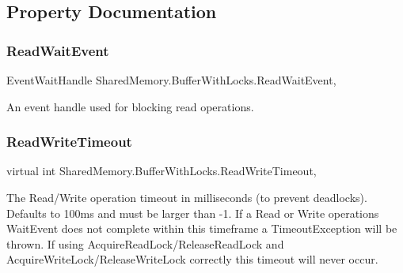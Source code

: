 \subsection{Property Documentation}
\mbox{\label{class_shared_memory_1_1_buffer_with_locks_a93181710ceef6b88e2d7647f976f1e79}} 
\subsubsection{\texorpdfstring{Read\+Wait\+Event}{ReadWaitEvent}}
{\footnotesize\ttfamily Event\+Wait\+Handle Shared\+Memory.\+Buffer\+With\+Locks.\+Read\+Wait\+Event\hspace{0.3cm}{\ttfamily [get]}, {\ttfamily [protected]}}



An event handle used for blocking read operations. 

\mbox{\label{class_shared_memory_1_1_buffer_with_locks_a5c1d09ad6c8629a8a8b7f2e5eca12e69}} 
\subsubsection{\texorpdfstring{Read\+Write\+Timeout}{ReadWriteTimeout}}
{\footnotesize\ttfamily virtual int Shared\+Memory.\+Buffer\+With\+Locks.\+Read\+Write\+Timeout\hspace{0.3cm}{\ttfamily [get]}, {\ttfamily [set]}}



The Read/\+Write operation timeout in milliseconds (to prevent deadlocks). Defaults to 100ms and must be larger than -\/1. If a Read or Write operation\textquotesingle{}s Wait\+Event does not complete within this timeframe a Timeout\+Exception will be thrown. If using Acquire\+Read\+Lock/\+Release\+Read\+Lock and Acquire\+Write\+Lock/\+Release\+Write\+Lock correctly this timeout will never occur. 

